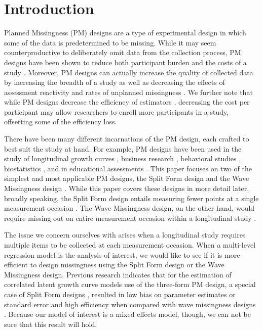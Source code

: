\documentclass{svjour3}                     %
\begin{document}
\section{Introduction}
\label{intro}
Planned Missingness (PM) designs are a type of experimental design in which some of the data is predetermined to be missing. While it may seem counterproductive to deliberately omit data from the collection process, PM designs have been shown to reduce both participant burden \citep{graham2006planned, saris20048} and the costs of a study \citep{graham2001planned}. Moreover, PM designs can actually increase the quality of collected data by increasing the breadth of a study \citep{little2013planned} as well as decreasing the effects of assessment reactivity and rates of unplanned missingness \cite{harel2015designed}. We further note that while PM designs decrease the efficiency of estimators \citep{rhemtulla2016asymptotic}, decreasing the cost per participant may allow researchers to enroll more participants in a study, offsetting some of the efficiency loss. \par

There have been many different incarnations of the PM design, each crafted to best suit the study at hand. For example, PM designs have been used in the study of longitudinal growth curves \citep{graham2001planned, mcardle1997expanding}, business research \citep{shoemaker1973principles}, behavioral studies \citep{harel2015designed}, biostatistics \citep{andres2006partial, wacholder1994partial}, and in educational assessments \citep{zeger1997efficient, sirotnik1977incidence}. This paper focuses on two of the simplest and most applicable PM designs, the Split Form design \citep{raghunathan1995split} and the Wave Missingness design \citep{little2013planned}. While this paper covers these designs in more detail later, broadly speaking, the Split Form design entails measuring fewer points at a single measurement occasion \citep{raghunathan1995split}. The Wave Missingness design, on the other hand, would require missing out on entire measurement occasion within a longitudinal study \citep{graham2001planned}. 

The issue we concern ourselves with arises when a longitudinal study requires multiple items to be collected at each measurement occasion. When a multi-level regression model is the analysis of interest, we would like to see if it is more efficient to design missingness using the Split Form design or the Wave Missingness design. Previous research indicates that for the estimation of correlated latent growth curve models use of the three-form PM design, a special case of Split Form designs \citep{raghunathan1995split}, resulted in low bias on parameter estimates or standard error and high efficiency when compared with wave missingness designs \citep{rhemtulla2014planned}. Because our model of interest is a mixed effects model, though, we can not be sure that this result will hold. \par 
\end{document}
